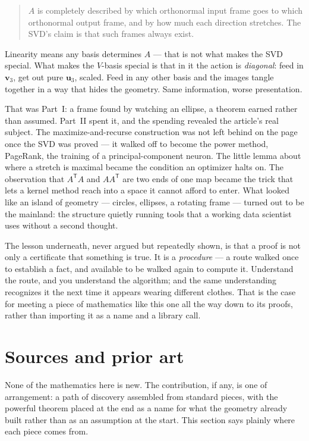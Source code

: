 \documentclass[11pt]{article}
\numberwithin{equation}{section}
\newcommand{\T}{^{\mathsf{T}}}
\newcommand{\vv}[1]{\mathbf{v}_{#1}}
\newcommand{\uu}[1]{\mathbf{u}_{#1}}
\theoremstyle{plainish}
\begin{document}
\begin{quote}
$A$ is completely described by which orthonormal input frame goes to which
orthonormal output frame, and by how much each direction stretches. The SVD's
claim is that such frames always exist.
\end{quote}

\noindent
Linearity means any basis determines $A$ --- that is not what makes the SVD
special. What makes the $V$-basis special is that in it the action is
\emph{diagonal}: feed in $\vv3$, get out pure $\uu3$, scaled. Feed in any other
basis and the images tangle together in a way that hides the geometry. Same
information, worse presentation.

That was Part~I: a frame found by watching an ellipse, a theorem earned rather
than assumed. Part~II spent it, and the spending revealed the article's real
subject. The maximize-and-recurse construction was not left behind on the page
once the SVD was proved --- it walked off to become the power method, PageRank,
the training of a principal-component neuron. The little lemma about where a
stretch is maximal became the condition an optimizer halts on. The observation
that $A\T A$ and $AA\T$ are two ends of one map became the trick that lets a
kernel method reach into a space it cannot afford to enter. What looked like an
island of geometry --- circles, ellipses, a rotating frame --- turned out to be
the mainland: the structure quietly running tools that a working data scientist
uses without a second thought.

The lesson underneath, never argued but repeatedly shown, is that a proof is not
only a certificate that something is true. It is a \emph{procedure} --- a route
walked once to establish a fact, and available to be walked again to compute it.
Understand the route, and you understand the algorithm; and the same
understanding recognizes it the next time it appears wearing different clothes.
That is the case for meeting a piece of mathematics like this one all the way
down to its proofs, rather than importing it as a name and a library call.

\section{Sources and prior art}
\label{sec:sources}

None of the mathematics here is new. The contribution, if any, is one of
arrangement: a path of discovery assembled from standard pieces, with the
powerful theorem placed at the end as a name for what the geometry already built
rather than as an assumption at the start. This section says plainly where each
piece comes from.
\end{document}
